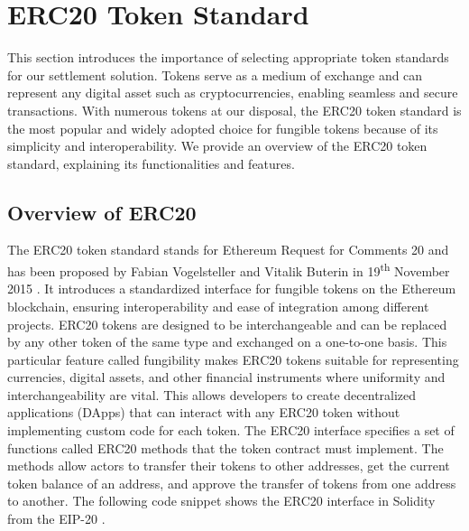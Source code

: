 
\section{ERC20 Token Standard}
\label{sec:ch2_erc20}

This section introduces the importance of selecting appropriate token standards for our settlement solution. Tokens serve as a medium of exchange and can represent any digital asset
such as cryptocurrencies, enabling seamless and secure transactions. With numerous tokens at our disposal, the ERC20 token standard is the most popular and widely adopted choice for
fungible tokens because of its simplicity and interoperability. We provide an overview of the ERC20 token standard, explaining its functionalities and features.


\subsection{Overview of ERC20}

The ERC20 token standard stands for Ethereum Request for Comments 20 and has been proposed by Fabian Vogelsteller and Vitalik Buterin in 19\textsuperscript{th} November 2015 \cite{eth_erc20}.
It introduces a standardized interface for fungible tokens on the Ethereum blockchain, ensuring interoperability and ease of integration among different projects. ERC20 tokens are
designed to be interchangeable and can be replaced by any other token of the same type and exchanged on a one-to-one basis. This particular feature called fungibility makes ERC20
tokens suitable for representing currencies, digital assets, and other financial instruments where uniformity and interchangeability are vital. This allows developers to
create decentralized applications (DApps) that can interact with any ERC20 token without implementing custom code for each token. The ERC20 interface specifies a set of functions
called ERC20 methods that the token contract must implement. The methods allow actors to transfer their tokens to other addresses, get the current token balance of an address, and approve
the transfer of tokens from one address to another. The following code snippet shows the ERC20 interface in Solidity from the EIP-20 \cite{eth_erc20}.

